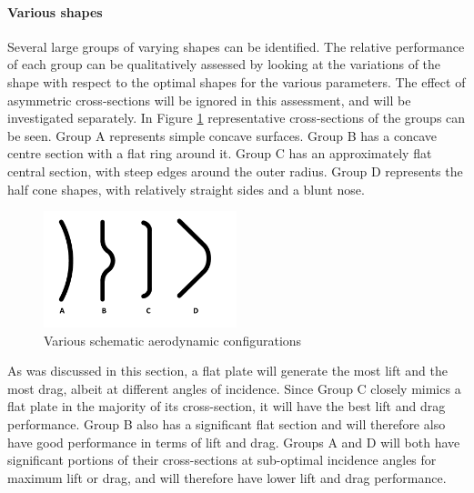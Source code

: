 \paragraph{Various shapes} \label{sec:aeroshapes}
Several large groups of varying shapes can be identified. The relative performance of each group can be qualitatively assessed by looking at the variations of the shape with respect to the optimal shapes for the various parameters. The effect of asymmetric cross-sections will be ignored in this assessment, and will be investigated separately. In Figure \ref{fig:aeroshapes} representative cross-sections of the groups can be seen. Group A represents simple concave surfaces. Group B has a concave centre section with a flat ring around it. Group C has an approximately flat central section, with steep edges around the outer radius. Group D represents the half cone shapes, with relatively straight sides and a blunt nose. 

\begin{figure}[h]
	\centering
	\includegraphics[width=0.5\textwidth]{./Figure/Aerodynamics/AeroShapes.pdf}
	\caption{Various schematic aerodynamic configurations}
	\label{fig:aeroshapes}
\end{figure}

As was discussed in this section, a flat plate will generate the most lift and the most drag, albeit at different angles of incidence. Since Group C closely mimics a flat plate in the majority of its cross-section, it will have the best lift and drag performance. Group B also has a significant flat section and will therefore also have good performance in terms of lift and drag. Groups A and D will both have significant portions of their cross-sections at sub-optimal incidence angles for maximum lift or drag, and will therefore have lower lift and drag performance.

